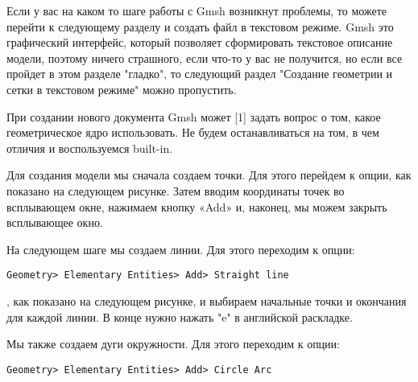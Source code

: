 \documentclass[11pt]{article}
\begin{document}
    Если у вас на каком то шаге работы с Gmsh возникнут проблемы, то можете перейти к следующему разделу и создать файл в текстовом режиме. Gmsh это графический интерфейс, который позволяет сформировать текстовое описание модели, поэтому ничего страшного, если что-то у вас не получится, но если все пройдет в этом разделе "гладко", то следующий раздел "Создание геометрии и сетки в текстовом режиме" можно пропустить.
    
    При создании нового документа Gmsh может [1] задать вопрос о том, какое геометрическое ядро ​​использовать. Не будем останавливаться на том, в чем отличия и воспользуемся built-in.
    
    \begin{center}
    \end{center}    
    
    Для создания модели мы сначала создаем точки. Для этого перейдем к опции, как показано на следующем рисунке. Затем вводим координаты точек во всплывающем окне, нажимаем кнопку «Add» и, наконец, мы можем закрыть всплывающее окно.

    \begin{center}
    \end{center}    
    
    На следующем шаге мы создаем линии.  Для этого переходим к опции: 

\begin{Verbatim}[commandchars=\\\{\}]
Geometry> Elementary Entities> Add> Straight line
\end{Verbatim}
    
    , как показано на следующем рисунке, и выбираем начальные точки и окончания для каждой линии. В конце нужно нажать "e" в английской раскладке.
    
    \begin{center}
    \end{center}    
    
Мы также создаем дуги окружности. Для этого переходим к опции:

\begin{Verbatim}[commandchars=\\\{\}]
Geometry> Elementary Entities> Add> Circle Arc
\end{Verbatim}
 
\end{document}
